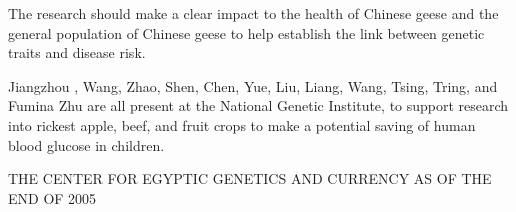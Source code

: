 \documentclass{article}
\begin{document}
The research should make a clear impact to the health of Chinese geese and the general population of Chinese geese to help establish the link between genetic traits and disease risk.

Jiangzhou , Wang, Zhao, Shen, Chen, Yue, Liu, Liang, Wang, Tsing, Tring, and Fumina Zhu are all present at the National Genetic Institute, to support research into rickest apple, beef, and fruit crops to make a potential saving of human blood glucose in children.

THE CENTER FOR EGYPTIC GENETICS AND CURRENCY AS OF THE END OF 2005
\end{document}
